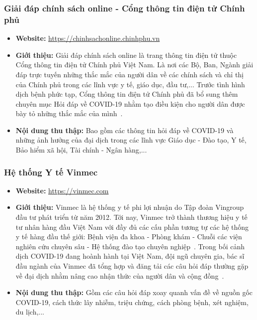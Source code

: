 \documentclass[runningheads]{llncs}
\begin{document}
\subsubsection{Giải đáp chính sách online - Cổng thông tin điện tử Chính phủ}
\begin{itemize}
\item \textbf{Website:} \url{https://chinhsachonline.chinhphu.vn}

\item \textbf{Giới thiệu:}
Giải đáp chính sách online là trang thông tin điện tử thuộc Cổng thông tin điện tử Chính phủ Việt Nam. Là nơi các Bộ, Ban, Ngành giải đáp trực tuyến những thắc mắc của người dân về các chính sách và chỉ thị của Chính phủ trong các lĩnh vực y tế, giáo dục, đầu tư,... Trước tình hình dịch bệnh phức tạp, Cổng thông tin điện tử Chính phủ đã bổ sung thêm chuyên mục Hỏi đáp về COVID-19 nhằm tạo điều kiện cho người dân được bày tỏ những thắc mắc của mình~\cite{ref_url9}.
\item \textbf{Nội dung thu thập:} Bao gồm các thông tin hỏi đáp về COVID-19 và những ảnh hưởng của đại dịch trong các lĩnh vực Giáo dục - Đào tạo, Y tế, Bảo hiểm xã hội, Tài chính - Ngân hàng,...

\end{itemize}

\subsubsection{Hệ thống Y tế Vinmec}
\begin{itemize}
\item \textbf{Website:} \url{https://vinmec.com}

\item \textbf{Giới thiệu:}
Vinmec là hệ thống y tế phi lợi nhuận do Tập đoàn Vingroup đầu tư phát triển từ năm 2012. Tới nay, Vinmec trở thành thương hiệu y tế tư nhân hàng đầu Việt Nam với đầy đủ các cấu phần tương tự các hệ thống y tế hàng đầu thế giới: Bệnh viện đa khoa - Phòng khám - Chuỗi các viện nghiên cứu chuyên sâu - Hệ thống đào tạo chuyên nghiệp~\cite{ref_url6}. Trong bối cảnh dịch COVID-19 đang hoành hành tại Việt Nam, đội ngũ chuyên gia, bác sĩ đầu ngành của Vinmec đã tổng hợp và đăng tải các câu hỏi đáp thường gặp về đại dịch nhằm nâng cao nhận thức của người dân và cộng đồng~\cite{ref_url10}.

\item \textbf{Nội dung thu thập:} Gồm các câu hỏi đáp xoay quanh vấn đề về nguồn gốc COVID-19, cách thức lây nhiễm, triệu chứng, cách phòng bệnh, xét nghiệm, du lịch,...

\end{itemize}
\end{document}

